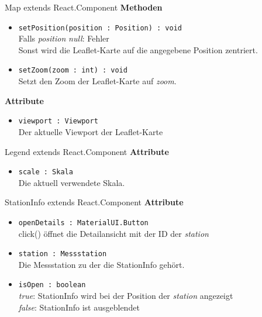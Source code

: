     \begin{Class}{Map extends React.Component}
        \textbf{Methoden}
        \begin{itemize}
            \item \texttt{setPosition(position : Position) : void}
            \\ Falls \emph{position} \emph{null}: Fehler
            \\ Sonst wird die Leaflet-Karte auf die angegebene Position zentriert.
            \item \texttt{setZoom(zoom : int) : void}
            \\ Setzt den Zoom der Leaflet-Karte auf \emph{zoom}.
        \end{itemize}
        \textbf{Attribute}
        \begin{itemize}
            \item \texttt{viewport : Viewport}
            \\ Der aktuelle Viewport der Leaflet-Karte
        \end{itemize}
    \end{Class}
    
    \begin{Class}{Legend extends React.Component}
        \textbf{Attribute}
        \begin{itemize}
            \item \texttt{scale : Skala}
            \\ Die aktuell verwendete Skala.
        \end{itemize}
    \end{Class}
    
    \begin{Class}{StationInfo extends React.Component}
        \textbf{Attribute}
        \begin{itemize}
            \item \texttt{openDetails : MaterialUI.Button}
            \\ click() öffnet die Detailansicht mit der ID der \emph{station}
            \item \texttt{station : Messstation}
            \\ Die Messstation zu der die StationInfo gehört.
            \item \texttt{isOpen : boolean}
            \\ \emph{true}: StationInfo wird bei der Position der \emph{station} angezeigt
            \\ \emph{false}: StationInfo ist ausgeblendet
        \end{itemize}
    \end{Class}

